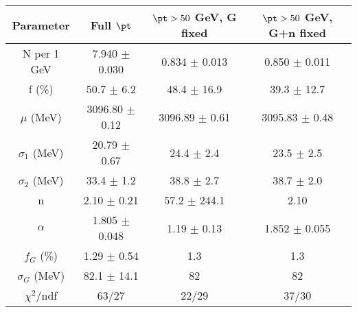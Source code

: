 \begin{tabular}{c||c|c|c}
Parameter & Full $\pt$ & $\pt>50$ GeV, G fixed & $\pt>50$ GeV, G+n fixed \\
\hline
N per 1 GeV & 7.940 $\pm$ 0.030 & 0.834 $\pm$ 0.013 & 0.850 $\pm$ 0.011\\
f (\%) & 50.7 $\pm$ 6.2 & 48.4 $\pm$ 16.9 & 39.3 $\pm$ 12.7\\
$\mu$ (MeV) & 3096.80 $\pm$ 0.12 & 3096.89 $\pm$ 0.61 & 3095.83 $\pm$ 0.48\\
$\sigma_1$ (MeV) & 20.79 $\pm$ 0.67 & 24.4 $\pm$ 2.4 & 23.5 $\pm$ 2.5\\
$\sigma_2$ (MeV) & 33.4 $\pm$ 1.2 & 38.8 $\pm$ 2.7 & 38.7 $\pm$ 2.0\\
n & 2.10 $\pm$ 0.21 & 57.2 $\pm$ 244.1 & 2.10\\
$\alpha$ & 1.805 $\pm$ 0.048 & 1.19 $\pm$ 0.13 & 1.852 $\pm$ 0.055\\
$f_G$ (\%) & 1.29 $\pm$ 0.54 & 1.3 & 1.3\\
$\sigma_G$ (MeV) & 82.1 $\pm$ 14.1 & 82 & 82\\
\hline
$\chi^2$/ndf & 63/27 & 22/29 & 37/30\\
\end{tabular}
